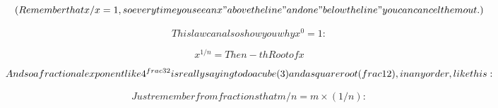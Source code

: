\[(Remember that x/x = 1, so every time you see an x "above the line" and one "below the line" you can cancel them out.)\]

\[This law can also show you why x^{0}=1 :\]

\[x^{1/n} = The n-th Root of x\]

\[And so a fractional exponent like 4^{\\frac{3}{2}} is really saying to do a cube (3) and a square root (\\frac{1}{2}), in any order, like this:\]

\[Just remember from fractions that m/n = m \times (1/n):\]

